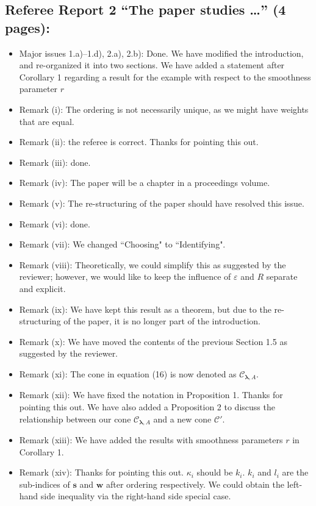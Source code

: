 \documentclass[11pt]{article}
\newcommand{\calC}{\mathcal{C}}
\begin{document}
\subsection*{Referee Report 2 ``The paper studies \ldots'' (4 pages):}

\begin{itemize}
\item Major issues 1.a)--1.d), 2.a), 2.b): Done. We have modified the introduction, and re-organized it into two sections. We have added a statement after Corollary 1 regarding a result for the example with respect to the smoothness parameter $r$
\item Remark (i): The ordering is not necessarily unique, as we might have weights 
that are equal. 
\item Remark (ii): the referee is correct. Thanks for pointing this out. 
\item Remark (iii): done. 
\item Remark (iv): The paper will be a chapter in a proceedings volume.
\item Remark (v): The re-structuring of the paper should have resolved this issue.
\item Remark (vi): done. 
\item Remark (vii): We changed ``Choosing" to ``Identifying".
\item Remark (viii): Theoretically, we could simplify this as suggested by the reviewer; however, we would like to keep the influence of $\varepsilon$ and $R$ separate and explicit. 
\item Remark (ix): We have kept this result as a theorem, but due to the re-structuring of the paper, it is no longer part of the introduction. 
\item Remark (x): We have moved the contents of the previous Section 1.5 as suggested by the reviewer. 
\item Remark (xi): The cone in equation (16) is now denoted as $\calC_{\boldsymbol{\lambda},A}$. 
\item Remark (xii): We have fixed the notation in Proposition 1. Thanks for pointing this out. We have also added a Proposition 2 to discuss the relationship between our cone $\mathcal{C}_{\boldsymbol{\lambda},A}$ and a new cone $\mathcal{C}'$.
\item Remark (xiii): We have added the results with smoothness parameters $r$ in Corollary 1.
\item Remark (xiv): Thanks for pointing this out. $\kappa_i$ should be $k_i$. $k_i$ and $l_i$ are the sub-indices of $\boldsymbol{s}$ and $\boldsymbol{w}$ after ordering respectively. We could obtain the left-hand side inequality via the right-hand side special case.

\end{itemize}
\end{document}

